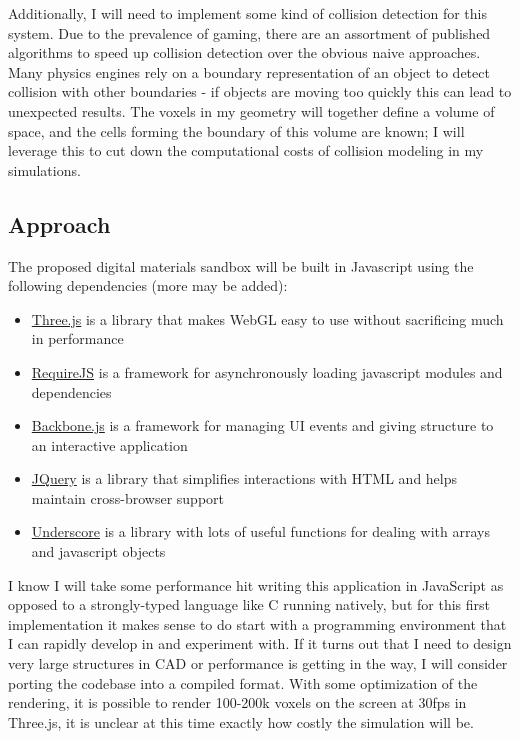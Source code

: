 {Additionally, I will need to implement some kind of collision detection for this system.  Due to the prevalence of gaming, there are an assortment of published algorithms to speed up  collision detection over the obvious naive approaches.  Many physics engines rely on a boundary representation of an object to detect collision with other boundaries - if objects are moving too quickly this can lead to unexpected results.  The voxels in my geometry will together define a volume of space, and the cells forming the boundary of this volume are known; I will leverage this to cut down the computational costs of collision modeling in my simulations.

\subsection{Approach}

The proposed digital materials sandbox will be built in Javascript using the following dependencies (more may be added):
\begin{itemize}
\setlength\itemsep{0em}
\item \href{http://threejs.org/}{Three.js} is a library that makes WebGL easy to use without sacrificing much in performance
\item \href{http://requirejs.org/}{RequireJS} is a framework for asynchronously loading javascript modules and dependencies
\item \href{http://backbonejs.org/}{Backbone.js} is a framework for managing UI events and giving structure to an interactive application
\item \href{https://jquery.com/}{JQuery} is a library that simplifies interactions with HTML and helps maintain cross-browser support
\item \href{http://underscorejs.org/}{Underscore} is a library with lots of useful functions for dealing with arrays and javascript objects
\end{itemize}

I know I will take some performance hit writing this application in JavaScript as opposed to a strongly-typed language like C running natively, but for this first implementation it makes sense to do start with a programming environment that I can rapidly develop in and experiment with.  If it turns out that I need to design very large structures in CAD or performance is getting in the way, I will consider porting the codebase into a compiled format.  With some optimization of the rendering, it is possible to render 100-200k voxels on the screen at 30fps in Three.js, it is unclear at this time exactly how costly the simulation will be.
\\

}
